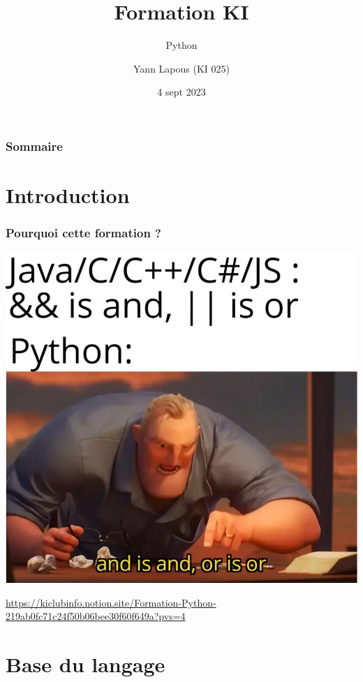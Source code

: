 \documentclass{beamer}
\title{Formation KI} %
\subtitle{Python} %
\author{Yann Lapous (KI 025)}
\date{4 sept 2023}
\begin{document}
    \begin{frame}
        \titlepage
    \end{frame}

    \begin{frame}
        \frametitle{Sommaire}
        \setcounter{tocdepth}{1}
        \tableofcontents
    \end{frame}
    \section*{Introduction}
    \begin{frame}
        \frametitle{Pourquoi cette formation ?}
        \centering
        \includegraphics[width=.5\textwidth]{assets/meme_python.png}
    \end{frame}
    \begin{frame}
        \centering

        \normalsize\url{https://kiclubinfo.notion.site/Formation-Python-219ab0fc71c24f50b06bee30f60f649a?pvs=4}
	\\[.5cm]
    \end{frame}
    
    \section{Base du langage}
\end{document}
